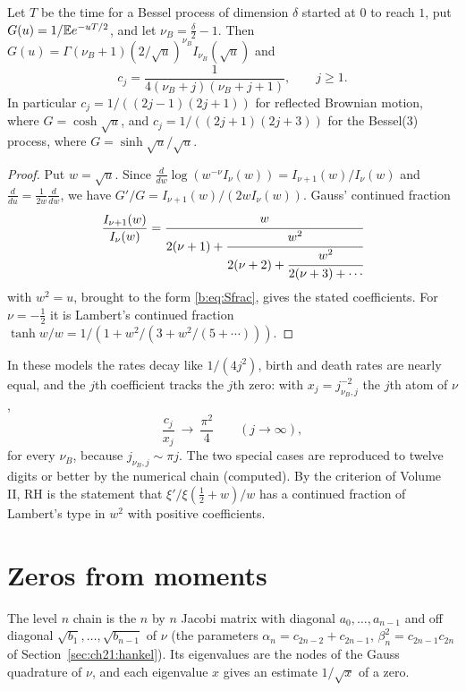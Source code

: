 \begin{proposition}\label{b:prop:bessel}
Let $T$ be the time for a Bessel process of dimension $\delta$ started at $0$ to reach $1$, put $G(u)=1/\mathbb{E} e^{-uT/2}$, and let $\nu_B=\frac\delta2-1$. Then $G(u)=\Gamma(\nu_B+1)(2/\sqrt u)^{\nu_B}I_{\nu_B}(\sqrt u)$ and
\[
c_j=\frac{1}{4(\nu_B+j)(\nu_B+j+1)},\qquad j\ge1 .
\]
In particular $c_j=1/((2j-1)(2j+1))$ for reflected Brownian motion, where $G=\cosh\sqrt u$, and $c_j=1/((2j+1)(2j+3))$ for the Bessel(3) process, where $G=\sinh\sqrt u/\sqrt u$.
\end{proposition}
\begin{proof}
Put $w=\sqrt u$. Since $\frac{d}{dw}\log(w^{-\nu}I_\nu(w))=I_{\nu+1}(w)/I_\nu(w)$ and $\frac{d}{du}=\frac1{2w}\frac{d}{dw}$, we have $G'/G=I_{\nu+1}(w)/(2wI_\nu(w))$. Gauss' continued fraction
\[
\frac{I_{\nu+1}(w)}{I_\nu(w)}
=\cfrac{w}{2(\nu+1)+\cfrac{w^2}{2(\nu+2)+\cfrac{w^2}{2(\nu+3)+\cdots}}}
\]
with $w^2=u$, brought to the form \eqref{b:eq:Sfrac}, gives the stated coefficients. For $\nu=-\frac12$ it is Lambert's continued fraction $\tanh w/w=1/(1+w^2/(3+w^2/(5+\cdots)))$.
\end{proof}

In these models the rates decay like $1/(4j^2)$, birth and death rates are nearly equal, and the $j$th coefficient tracks the $j$th zero: with $x_j=j_{\nu_B,j}^{-2}$ the $j$th atom of $\nu$,
\begin{equation}\label{b:eq:pi4}
\frac{c_j}{x_j}\ \longrightarrow\ \frac{\pi^2}{4}\qquad(j\to\infty),
\end{equation}
for every $\nu_B$, because $j_{\nu_B,j}\sim\pi j$. The two special cases are reproduced to twelve digits or better by the numerical chain (computed). By the criterion of Volume II, RH is the statement that $\xi'/\xi(\frac12+w)/w$ has a continued fraction of Lambert's type in $w^2$ with positive coefficients.

\section{Zeros from moments}

The level $n$ chain is the $n$ by $n$ Jacobi matrix with diagonal $a_0,\dots,a_{n-1}$ and off diagonal $\sqrt{b_1},\dots,\sqrt{b_{n-1}}$ of $\nu$ (the parameters $\alpha_n=c_{2n-2}+c_{2n-1}$, $\beta_n^2=c_{2n-1}c_{2n}$ of Section~\ref{sec:ch21:hankel}). Its eigenvalues are the nodes of the Gauss quadrature of $\nu$, and each eigenvalue $x$ gives an estimate $1/\sqrt x$ of a zero.

